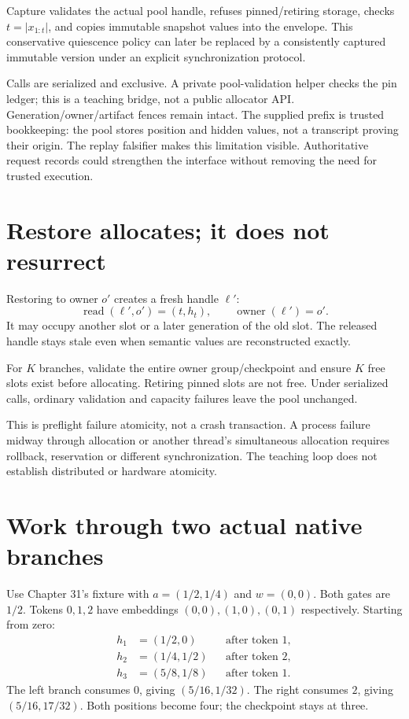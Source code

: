 Capture validates the actual pool handle, refuses pinned/retiring storage,
checks $t=|x_{1:t}|$, and copies immutable snapshot values into the envelope.
This conservative quiescence policy can later be replaced by a consistently
captured immutable version under an explicit synchronization protocol.


Calls are serialized and exclusive. A private pool-validation helper checks
the pin ledger; this is a teaching bridge, not a public allocator API.
Generation/owner/artifact fences remain intact.
The supplied prefix is trusted bookkeeping: the pool stores position and
hidden values, not a transcript proving their origin. The replay falsifier
makes this limitation visible. Authoritative request records could strengthen
the interface without removing the need for trusted execution.

\section{Restore allocates; it does not resurrect}

Restoring to owner $o'$ creates a fresh handle $\ell'$:
\[
 \operatorname{read}(\ell',o')=(t,h_t),\qquad
 \operatorname{owner}(\ell')=o'.
\]
It may occupy another slot or a later generation of the old slot. The released
handle stays stale even when semantic values are reconstructed exactly.

For $K$ branches, validate the entire owner group/checkpoint and ensure $K$
free slots exist before allocating. Retiring pinned slots are not free.
Under serialized calls, ordinary validation and capacity failures leave the
pool unchanged.


This is preflight failure atomicity, not a crash transaction. A process
failure midway through allocation or another thread's simultaneous allocation
requires rollback, reservation or different synchronization. The teaching
loop does not establish distributed or hardware atomicity.

\section{Work through two actual native branches}

Use Chapter 31's fixture with $a=(1/2,1/4)$ and $w=(0,0)$. Both gates are
$1/2$. Tokens $0,1,2$ have embeddings $(0,0),(1,0),(0,1)$ respectively.
Starting from zero:
\begin{align*}
 h_1&=(1/2,0) &&\text{after token }1,\\
 h_2&=(1/4,1/2) &&\text{after token }2,\\
 h_3&=(5/8,1/8) &&\text{after token }1.
\end{align*}
The left branch consumes $0$, giving $(5/16,1/32)$. The right consumes $2$,
giving $(5/16,17/32)$. Both positions become four; the checkpoint stays at three.

